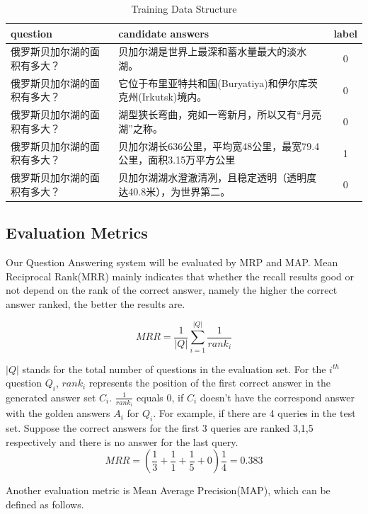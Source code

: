 \documentclass{llncs}
\begin{document}
\begin{table}[!hbp]
\caption{Training Data Structure}
\scriptsize
\label{tab:table1}
\begin{tabular}{|l|l|c|}
 \hline
question & candidate answers & label \\ \hline
俄罗斯贝加尔湖的面积有多大？& 贝加尔湖是世界上最深和蓄水量最大的淡水湖。& 0 \\
\hline
俄罗斯贝加尔湖的面积有多大？& 它位于布里亚特共和国(Buryatiya)和伊尔库茨克州(Irkutsk)境内。&0\\
\hline
俄罗斯贝加尔湖的面积有多大？& 湖型狭长弯曲，宛如一弯新月，所以又有“月亮湖”之称。&0\\
\hline
俄罗斯贝加尔湖的面积有多大？& 贝加尔湖长636公里，平均宽48公里，最宽79.4公里，面积3.15万平方公里& 1\\
\hline
俄罗斯贝加尔湖的面积有多大？& 贝加尔湖湖水澄澈清冽，且稳定透明（透明度达40.8米），为世界第二。&0\\
\hline
\end{tabular}

\end{table}

\subsection{Evaluation Metrics}
Our Question Answering system will be evaluated by MRP and MAP. Mean Reciprocal Rank(MRR) mainly indicates that whether the recall results good or not depend on the rank of the correct answer, namely the higher the correct answer ranked, the better the results are.

\begin{equation}
MRR=\frac{1}{|Q|}\sum_{i=1}^{|Q|}\frac{1}{rank_{i}}
\end{equation}

$|Q|$ stands for the total number of questions in the evaluation set. For the \(i^{th}\) question \(Q_{i}\), \(rank_{i}\) represents the position of the first correct answer in the generated answer set \(C_{i}\). \(\frac{1}{rank_{i}}\) equals 0, if \(C_{i}\) doesn't have the correspond answer with the golden answers \(A_{i}\) for \(Q_{i}\). For example, if there are 4 queries in the test set. Suppose the correct answers for the first 3 queries are ranked 3,1,5 respectively and there is no answer for the last query.
$$MRR=(\frac{1}{3}+\frac{1}{1}+\frac{1}{5}+0)\frac{1}{4}=0.383$$

Another evaluation metric is Mean Average Precision(MAP), which can be defined as follows.
\end{document}
